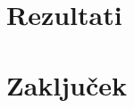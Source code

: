 \documentclass[a4paper]{article}
\begin{document}
\section{Rezultati}

\section{Zaključek}
\end{document}
